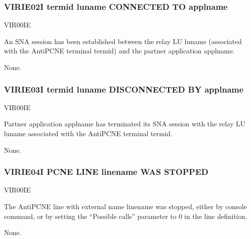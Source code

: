 \documentclass[letterpaper,10pt,english]{sphinxmanual}
\begin{document}
\subsubsection{VIRIE02I termid luname CONNECTED TO applname}
\label{\detokenize{messages:virie02i-termid-luname-connected-to-applname}}\begin{description}
\sphinxAtStartPar
VIR00IE

\sphinxAtStartPar
An SNA session has been established between the relay LU luname (associated with the AntiPCNE terminal termid) and the partner application applname.

\sphinxAtStartPar
None.

\end{description}


\subsubsection{VIRIE03I termid luname DISCONNECTED BY applname}
\label{\detokenize{messages:virie03i-termid-luname-disconnected-by-applname}}\begin{description}
\sphinxAtStartPar
VIR00IE

\sphinxAtStartPar
Partner application applname has terminated its SNA session with the relay LU luname associated with the AntiPCNE terminal termid.

\sphinxAtStartPar
None.

\end{description}


\subsubsection{VIRIE04I PCNE LINE linename WAS STOPPED}
\label{\detokenize{messages:virie04i-pcne-line-linename-was-stopped}}\begin{description}
\sphinxAtStartPar
VIR00IE

\sphinxAtStartPar
The AntiPCNE line with external name linename was stopped, either by console command, or by setting the “Possible calls” parameter to 0 in the line definition.

\sphinxAtStartPar
None.

\end{description}
\end{document}
